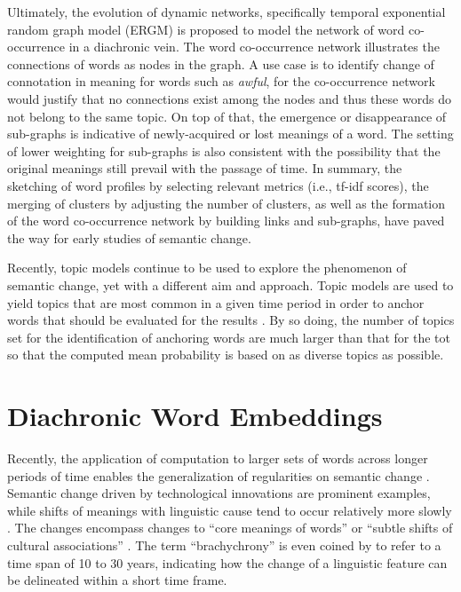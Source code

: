 Ultimately, the evolution of dynamic networks, specifically temporal exponential random graph model (ERGM) \parencite{robins2007introduction,wijaya2011understanding} is proposed to model the network of word co-occurrence in a diachronic vein. The word co-occurrence network illustrates the connections of words as nodes in the graph. A use case is to identify change of connotation in meaning for words such as \textit{awful}, for the co-occurrence network would justify that no connections exist among the nodes and thus these words do not belong to the same topic. On top of that, the emergence or disappearance of sub-graphs is indicative of newly-acquired or lost meanings of a word. The setting of lower weighting for sub-graphs is also consistent with the possibility that the original meanings still prevail with the passage of time. In summary, the sketching of word profiles by selecting relevant metrics (i.e., tf-idf scores), the merging of clusters by adjusting the number of clusters, as well as the formation of the word co-occurrence network by building links and sub-graphs, have paved the way for early studies of semantic change.

Recently, topic models continue to be used to explore the phenomenon of semantic change, yet with a different aim and approach. Topic models are used to yield topics that are most common in a given time period in order to anchor words that should be evaluated for the results \parencite{antoniak2018evaluating}. By so doing, the number of topics set for the identification of anchoring words are much larger than that for the \gls{tot} so that the computed mean probability is based on as diverse topics as possible.

\section{Diachronic Word Embeddings}
Recently, the application of computation to larger sets of words across longer periods of time enables the generalization of regularities on semantic change \parencite{hamilton2016law}. Semantic change driven by technological innovations are prominent examples, while shifts of meanings with linguistic cause tend to occur relatively more slowly \parencite{hamilton2016law}. The changes encompass changes to ``core meanings of words'' or ``subtle shifts of cultural associations'' \parencite{hamilton2016cultural}. The term ``brachychrony'' is even coined by \textcite{mair1998corpora} \textcite{renouf2002time} to refer to a time span of 10 to 30 years, indicating how the change of a linguistic feature can be delineated within a short time frame.

